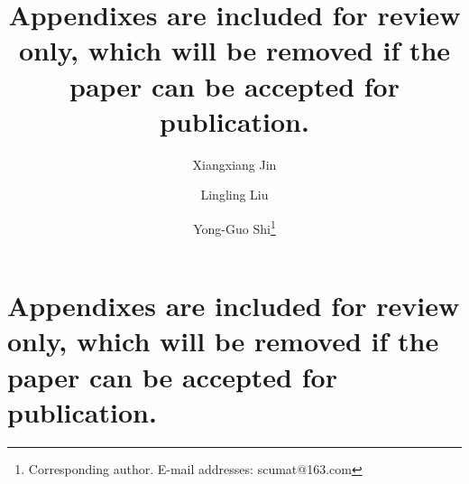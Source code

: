\documentclass{ws-ijbc}
\begin{document}
\catchline{}{}{}{}{} %



\title{Appendixes are included for review only, which will be removed if the paper can be accepted for publication.
}

\author{Xiangxiang Jin}

\address{School of Sciences, Southwest Petroleum University\\
 Chengdu, Sichuan 610500, China}

\author{Lingling Liu}
\address{School of Sciences, Southwest Petroleum University\\
 Chengdu, Sichuan 610500, China\\
Data Recovery Key Laboratory of Sichuan Province\\
College of Mathematics and Information Science, Neijiang Normal University\\
Neijiang, Sichuan 641100, China\\
a600aa@163.com}

\author{Yong-Guo Shi\footnote{Corresponding author.
E-mail addresses: scumat@163.com}}
\address{Data Recovery Key Laboratory of Sichuan Province\\
College of Mathematics and Information Science, Neijiang Normal University\\
Neijiang, Sichuan 641100, China\\
scumat@163.com}



\maketitle
\newpage


\section*{Appendixes are included for review only, which will be removed if the paper can be accepted for publication.}

\end{document}
